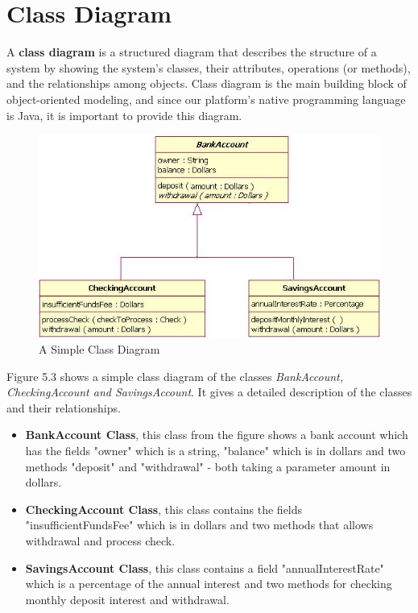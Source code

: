 \section{Class Diagram}
A {\bf class diagram} is a structured diagram that describes the structure of a system by showing the system's classes, their attributes, operations (or methods), and the relationships among objects. Class diagram is the main building block of object-oriented modeling, and since our platform's native programming language is Java, it is important to provide this diagram.

\begin{figure}[ht!]
\centering
\includegraphics[width=140mm]{class_diagram.jpg}
\caption{A Simple Class Diagram}
\label{overflow}
\end{figure}   

Figure 5.3 shows a simple class diagram of the classes {\it BankAccount, CheckingAccount and SavingsAccount}. It gives a detailed description of the classes and their relationships.

\begin{itemize}
\item{\bf BankAccount Class}, this class from the figure shows a bank account which has the fields "owner" which is a string, "balance" which is in dollars and two methods "deposit" and "withdrawal" - both taking a parameter amount in dollars.
\item{\bf CheckingAccount Class}, this class contains the fields "insufficientFundsFee" which is in dollars and two methods that allows withdrawal and process check.
\item{\bf SavingsAccount Class}, this class contains a field "annualInterestRate" which is a percentage of the annual interest  and two methods for checking monthly deposit interest and withdrawal.
\end{itemize}


